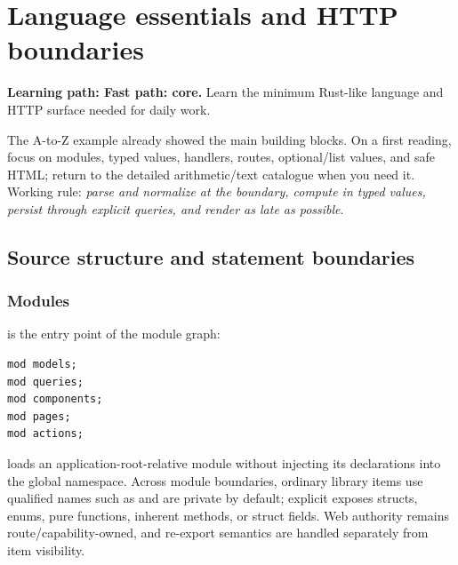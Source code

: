 \chapter{Language essentials and HTTP boundaries}

\noindent\textbf{Learning path: Fast path: core.} Learn the minimum Rust-like language and HTTP surface needed for daily work.\par\medskip



The A-to-Z example already showed the main building blocks. On a first reading, focus on modules, typed values, handlers, routes, optional/list values, and safe HTML; return to the detailed arithmetic/text catalogue when you need it. Working rule: \emph{parse and normalize at the boundary, compute in typed values, persist through explicit queries, and render as late as possible}.

\section{Source structure and statement boundaries}

\subsection*{Modules}

 is the entry point of the module graph:

\begin{lstlisting}[language=Velran]
mod models;
mod queries;
mod components;
mod pages;
mod actions;
\end{lstlisting}

 loads an application-root-relative module without injecting its declarations into the global namespace. Across module boundaries, ordinary library items use qualified names such as  and are private by default; explicit  exposes structs, enums, pure functions, inherent methods, or struct fields. Web authority remains route/capability-owned, and  re-export semantics are handled separately from item visibility.


